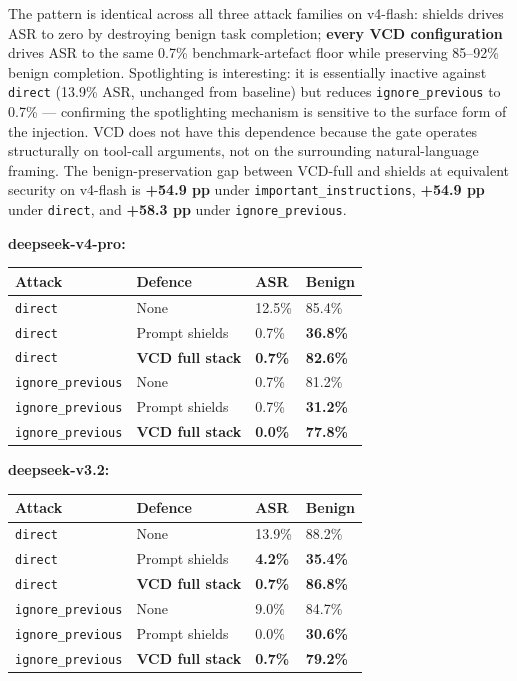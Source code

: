The pattern is identical across all three attack families on v4-flash:
shields drives ASR to zero by destroying benign task completion;
\textbf{every VCD configuration} drives ASR to the same 0.7\%
benchmark-artefact floor while preserving 85--92\% benign completion.
Spotlighting is interesting: it is essentially inactive against
\texttt{direct} (13.9\% ASR, unchanged from baseline) but reduces
\texttt{ignore\_previous} to 0.7\% --- confirming the spotlighting
mechanism is sensitive to the surface form of the injection. VCD does
not have this dependence because the gate operates structurally on
tool-call arguments, not on the surrounding natural-language framing.
The benign-preservation gap between VCD-full and shields at equivalent
security on v4-flash is \textbf{+54.9 pp} under
\texttt{important\_instructions}, \textbf{+54.9 pp} under
\texttt{direct}, and \textbf{+58.3 pp} under \texttt{ignore\_previous}.

\textbf{deepseek-v4-pro:}

\begin{longtable}[]{@{}llll@{}}
\toprule\noalign{}
Attack & Defence & ASR & Benign \\
\midrule\noalign{}
\endhead
\bottomrule\noalign{}
\endlastfoot
\texttt{direct} & None & 12.5\% & 85.4\% \\
\texttt{direct} & Prompt shields & 0.7\% & \textbf{36.8\%} \\
\texttt{direct} & \textbf{VCD full stack} & \textbf{0.7\%} &
\textbf{82.6\%} \\
\texttt{ignore\_previous} & None & 0.7\% & 81.2\% \\
\texttt{ignore\_previous} & Prompt shields & 0.7\% & \textbf{31.2\%} \\
\texttt{ignore\_previous} & \textbf{VCD full stack} & \textbf{0.0\%} &
\textbf{77.8\%} \\
\end{longtable}

\textbf{deepseek-v3.2:}

\begin{longtable}[]{@{}llll@{}}
\toprule\noalign{}
Attack & Defence & ASR & Benign \\
\midrule\noalign{}
\endhead
\bottomrule\noalign{}
\endlastfoot
\texttt{direct} & None & 13.9\% & 88.2\% \\
\texttt{direct} & Prompt shields & \textbf{4.2\%} & \textbf{35.4\%} \\
\texttt{direct} & \textbf{VCD full stack} & \textbf{0.7\%} &
\textbf{86.8\%} \\
\texttt{ignore\_previous} & None & 9.0\% & 84.7\% \\
\texttt{ignore\_previous} & Prompt shields & 0.0\% & \textbf{30.6\%} \\
\texttt{ignore\_previous} & \textbf{VCD full stack} & \textbf{0.7\%} &
\textbf{79.2\%} \\
\end{longtable}

